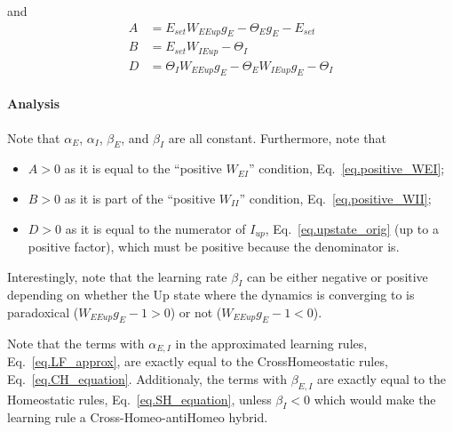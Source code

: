 \documentclass[twocolumn]{article}
\newcommand{\EE}{\mathit{EE}}
\newcommand{\EI}{\mathit{EI}}
\newcommand{\IE}{\mathit{IE}}
\newcommand{\II}{\mathit{II}}
\newcommand{\set}{\mathit{set}}
\newcommand{\up}{\mathit{up}}
\begin{document}
\noindent and
\begin{displaymath}
\begin{aligned}
A & = E_{\set} W_{\EE\up} g_E - \Theta_E g_E - E_{\set} \\
B & = E_{\set} W_{\IE\up} - \Theta_I \\
D & = \Theta_I W_{\EE\up} g_E - \Theta_E W_{\IE\up} g_E - \Theta_I
\end{aligned}
\end{displaymath}

\paragraph{Analysis} Note that $\alpha_E$, $\alpha_I$, $\beta_E$, and $\beta_I$ are all constant. Furthermore, note that
\begin{itemize}
\item $A>0$ as it is equal to the ``positive $W_{\EI}$'' condition, Eq.\ \ref{eq.positive_WEI};
\item $B>0$ as it is part of the ``positive $W_{\II}$'' condition, Eq.\ \ref{eq.positive_WII};
\item $D>0$ as it is equal to the numerator of $I_{\up}$, Eq.\ \ref{eq.upstate_orig} (up to a positive factor), which must be positive because the denominator is.
\end{itemize}

\noindent Interestingly, note that the learning rate $\beta_I$ can be either negative or positive depending on whether the Up state where the dynamics is converging to is paradoxical ($W_{\EE\up}g_E - 1 > 0$) or not ($W_{\EE\up}g_E - 1 < 0$).


\noindent Note that the terms with $\alpha_{E,I}$ in the approximated learning rules, Eq.\ \ref{eq.LF_approx}, are exactly equal to the CrossHomeostatic rules, Eq.\ \ref{eq.CH_equation}. Additionaly, the terms with $\beta_{E,I}$ are exactly equal to the Homeostatic rules, Eq.\ \ref{eq.SH_equation}, unless $\beta_I<0$ which would make the learning rule a Cross-Homeo-antiHomeo hybrid.





\printbibliography
\end{document}
